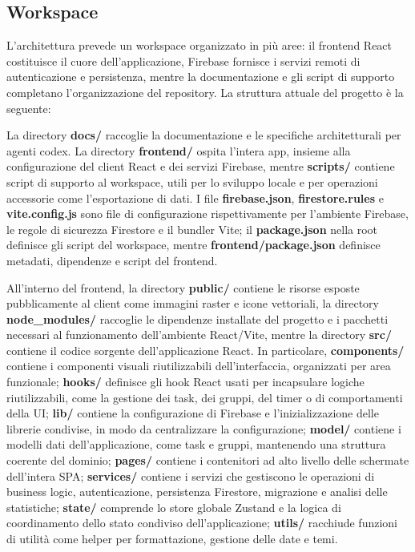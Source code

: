 \documentclass[11pt,a4paper]{article}
\begin{document}
\subsection{Workspace}

\par L'architettura prevede un workspace organizzato in più aree: il frontend React costituisce il cuore dell'applicazione, Firebase fornisce i servizi remoti di autenticazione e persistenza, mentre la documentazione e gli script di supporto completano l'organizzazione del repository. La struttura attuale del progetto è la seguente:


\par La directory \textbf{docs/} raccoglie la documentazione e le specifiche architetturali per agenti codex. La directory \textbf{frontend/} ospita l'intera app, insieme alla configurazione del client React e dei servizi Firebase, mentre \textbf{scripts/} contiene script di supporto al workspace, utili per lo sviluppo locale e per operazioni accessorie come l'esportazione di dati. I file \textbf{firebase.json}, \textbf{firestore.rules} e \textbf{vite.config.js} sono file di configurazione rispettivamente per l'ambiente Firebase, le regole di sicurezza Firestore e il bundler Vite; il \textbf{package.json} nella root definisce gli script del workspace, mentre \textbf{frontend/package.json} definisce metadati, dipendenze e script del frontend.

\par All'interno del frontend, la directory \textbf{public/} contiene le risorse esposte pubblicamente al client come immagini raster e icone vettoriali, la directory \textbf{node\_modules/} raccoglie le dipendenze installate del progetto e i pacchetti necessari al funzionamento dell'ambiente React/Vite, mentre la directory \textbf{src/} contiene il codice sorgente dell'applicazione React. In particolare, \textbf{components/} contiene i componenti visuali riutilizzabili dell'interfaccia, organizzati per area funzionale; \textbf{hooks/} definisce gli hook React usati per incapsulare logiche riutilizzabili, come la gestione dei task, dei gruppi, del timer o di comportamenti della UI; \textbf{lib/} contiene la configurazione di Firebase e l'inizializzazione delle librerie condivise, in modo da centralizzare la configurazione; \textbf{model/} contiene i modelli dati dell'applicazione, come task e gruppi, mantenendo una struttura coerente del dominio; \textbf{pages/} contiene i contenitori ad alto livello delle schermate dell'intera SPA; \textbf{services/} contiene i servizi che gestiscono le operazioni di business logic, autenticazione, persistenza Firestore, migrazione e analisi delle statistiche; \textbf{state/} comprende lo store globale Zustand e la logica di coordinamento dello stato condiviso dell'applicazione; \textbf{utils/} racchiude funzioni di utilità come helper per formattazione, gestione delle date e temi.
\end{document}

